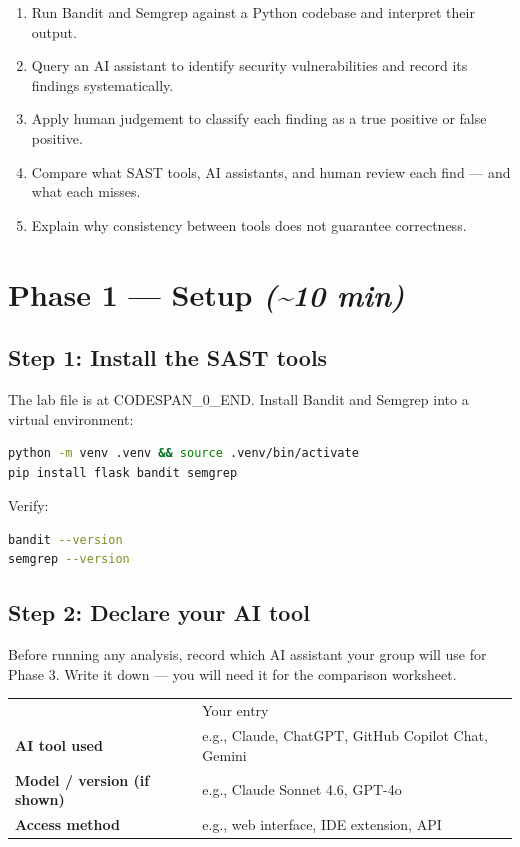 \documentclass[11pt,a4paper]{book}
\begin{document}
\begin{enumerate}
  \item Run Bandit and Semgrep against a Python codebase and interpret their output.
  \item Query an AI assistant to identify security vulnerabilities and record its findings systematically.
  \item Apply human judgement to classify each finding as a true positive or false positive.
  \item Compare what SAST tools, AI assistants, and human review each find --- and what each misses.
  \item Explain why consistency between tools does not guarantee correctness.
\end{enumerate}

\medskip

\section{Phase 1 --- Setup \textit{(\textasciitilde{}10 min)}}

\subsection{Step 1: Install the SAST tools}

The lab file is at CODESPAN\_0\_END. Install Bandit and Semgrep into a virtual environment:

\begin{lstlisting}[language=Bash]
python -m venv .venv && source .venv/bin/activate
pip install flask bandit semgrep
\end{lstlisting}

Verify:

\begin{lstlisting}[language=Bash]
bandit --version
semgrep --version
\end{lstlisting}

\subsection{Step 2: Declare your AI tool}

Before running any analysis, record which AI assistant your group will use for Phase 3. Write it down --- you will need it for the comparison worksheet.

\begin{tabular}{ll}
\hline
 & Your entry \\
\textbf{AI tool used} & e.g., Claude, ChatGPT, GitHub Copilot Chat, Gemini \\
\textbf{Model / version (if shown)} & e.g., Claude Sonnet 4.6, GPT-4o \\
\textbf{Access method} & e.g., web interface, IDE extension, API \\
\hline
\end{tabular}
\end{document}
